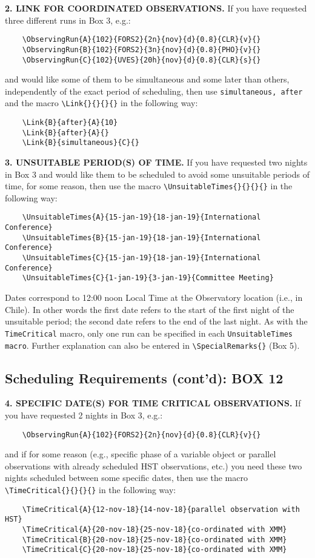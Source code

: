 \documentclass{article}
\begin{document}
\medskip

{\bf 2.  LINK FOR COORDINATED OBSERVATIONS.} If you have requested
three different runs in Box 3, e.g.:
\begin{verbatim}
    \ObservingRun{A}{102}{FORS2}{2n}{nov}{d}{0.8}{CLR}{v}{}
    \ObservingRun{B}{102}{FORS2}{3n}{nov}{d}{0.8}{PHO}{v}{}
    \ObservingRun{C}{102}{UVES}{20h}{nov}{d}{0.8}{CLR}{s}{}
\end{verbatim}
and would like some of them to be simultaneous and some later than
others, independently of the exact period of scheduling, then use
\verb|simultaneous, after| and the macro \verb|\Link{}{}{}{}| in the
following way:
\begin{verbatim}
    \Link{B}{after}{A}{10}
    \Link{B}{after}{A}{}
    \Link{B}{simultaneous}{C}{}
\end{verbatim}

\medskip

{\bf 3. UNSUITABLE PERIOD(S) OF TIME.}  If you have requested two
nights in Box 3 and would like them to be scheduled to avoid some
unsuitable periods of time, for some reason, then use the macro
\verb|\UnsuitableTimes{}{}{}{}| in the following way:
\begin{verbatim}
    \UnsuitableTimes{A}{15-jan-19}{18-jan-19}{International Conference}
    \UnsuitableTimes{B}{15-jan-19}{18-jan-19}{International Conference}
    \UnsuitableTimes{C}{15-jan-19}{18-jan-19}{International Conference}
    \UnsuitableTimes{C}{1-jan-19}{3-jan-19}{Committee Meeting}
\end{verbatim}

Dates correspond to 12:00 noon Local Time at
the Observatory location (i.e., in Chile).
In other words the first date refers to the start of the first night
of the unsuitable period; the second date refers to the end of the last night.
As with the \verb|TimeCritical| macro, only one run can be specified in each
\verb|UnsuitableTimes macro|. 
Further explanation can also be entered in  \verb|\SpecialRemarks{}| (Box 5).

\subsection{Scheduling Requirements (cont’d): {\bf BOX 12}}
\label{sec:timecrit}

{\bf 4. SPECIFIC DATE(S) FOR TIME CRITICAL OBSERVATIONS.} If you have
requested 2 nights in Box 3, e.g.:
\begin{verbatim}
    \ObservingRun{A}{102}{FORS2}{2n}{nov}{d}{0.8}{CLR}{v}{} 
\end{verbatim}
and if for some reason (e.g., specific phase of a variable object
or parallel observations with already scheduled HST observations,
etc.) you need these two nights scheduled between some specific
dates, then use the macro \verb|\TimeCritical{}{}{}{}| in the
following way:
\begin{verbatim}
    \TimeCritical{A}{12-nov-18}{14-nov-18}{parallel observation with HST}
    \TimeCritical{A}{20-nov-18}{25-nov-18}{co-ordinated with XMM}     
    \TimeCritical{B}{20-nov-18}{25-nov-18}{co-ordinated with XMM}
    \TimeCritical{C}{20-nov-18}{25-nov-18}{co-ordinated with XMM}
\end{verbatim}
\end{document}
